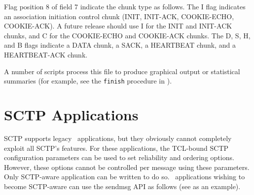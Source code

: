       Flag position 8 of field 7 indicate the chunk type as follows. The
      {\sf I} flag indicates an association initiation control chunk
      (INIT, INIT-ACK, COOKIE-ECHO, COOKIE-ACK). A future release should
      use {\sf I} for the INIT and INIT-ACK chunks, and {\sf C} for the
      COOKIE-ECHO and COOKIE-ACK chunks. The {\sf D}, {\sf S}, {\sf H},
      and {\sf B} flags indicate a DATA chunk, a SACK, a HEARTBEAT chunk,
      and a HEARTBEAT-ACK chunk.

      A number of scripts process this file to produce graphical output or
      statistical summaries (for example, see the {\tt finish} procedure
      in ).

   \section{SCTP Applications}
   \label{sec:sctpApps}

      SCTP supports legacy \ns~applications, but they obviously cannot
      completely exploit all SCTP's features. For these applications, the
      TCL-bound SCTP configuration parameters can be used to set
      reliability and ordering options. However, these options cannot be
      controlled per message using these parameters. Only SCTP-aware
      application can be written to do so. \ns~applications wishing to
      become SCTP-aware can use the sendmsg API as follows (see
       as an example).

